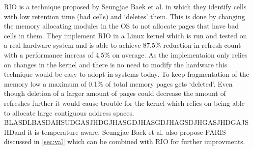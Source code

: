 RIO is a technique proposed by Seungjae Baek et al. \cite{rioparis} in which they identify cells with low retention time (bad cells) and `deletes' them. This is done by changing the memory allocating modules in the OS to not allocate pages that have bad cells in them. They implement RIO in a Linux kernel which is run and tested on a real hardware system and is able to achieve 87.5\% reduction in refresh count with a performance increas of 4.5\% on average. As the implementaion only relies on changes in the kernel and there is no need to modify the hardware this technique would be easy to adopt in systems today. To keep fragmentation of the memory low a maximum of 0.1\% of total memory pages gets `deleted'. Even though deletion of a larger amount of pages could decrease the amount of refreshes further it would cause trouble for the kernel which relies on being able to allocate large contiguous address spaces. BLASDLBASDAHSUDGASJHDGJHASGDJHASGDJHAGSDJHGASJHDGAJSHDand it is temperature aware. Seungjae Baek et al. also propose PARIS discussed in \ref{sec:val} which can be combined with RIO for further improvments.